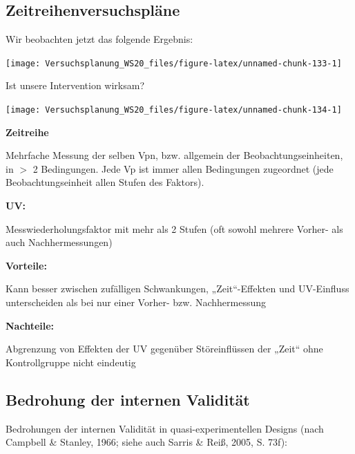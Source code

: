\documentclass[
]{book}
\begin{document}
\hypertarget{zeitreihenversuchspluxe4ne}{%
\subsection{Zeitreihenversuchspläne}\label{zeitreihenversuchspluxe4ne}}

Wir beobachten jetzt das folgende Ergebnis:

\begin{center}\texttt{[image: Versuchsplanung\_WS20\_files/figure-latex/unnamed-chunk-133-1]} \end{center}

Ist unsere Intervention wirksam?

\begin{center}\texttt{[image: Versuchsplanung\_WS20\_files/figure-latex/unnamed-chunk-134-1]} \end{center}

\textbf{Zeitreihe}

Mehrfache Messung der selben Vpn, bzw. allgemein der
Beobachtungseinheiten, in \(>\) 2 Bedingungen. Jede Vp ist immer allen
Bedingungen zugeordnet (jede Beobachtungseinheit allen Stufen des Faktors).

\textbf{UV:}

Messwiederholungsfaktor mit mehr als 2 Stufen (oft sowohl mehrere Vorher-
als auch Nachhermessungen)

\textbf{Vorteile:}

Kann besser zwischen zufälligen Schwankungen, „Zeit``-Effekten und UV-Einfluss
unterscheiden als bei nur einer Vorher- bzw. Nachhermessung

\textbf{Nachteile:}

Abgrenzung von Effekten der UV gegenüber Störeinflüssen der „Zeit`` ohne
Kontrollgruppe nicht eindeutig

\hypertarget{bedrohung-der-internen-validituxe4t}{%
\subsection{Bedrohung der internen Validität}\label{bedrohung-der-internen-validituxe4t}}

Bedrohungen der internen Validität in quasi-experimentellen Designs
(nach Campbell \& Stanley, 1966; siehe auch Sarris \& Reiß, 2005, S. 73f):
\end{document}
